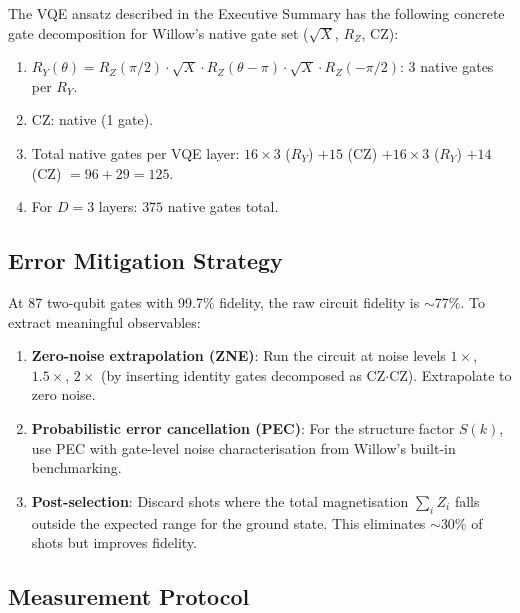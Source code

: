 \documentclass[11pt]{article}
\theoremstyle{definition}
\theoremstyle{remark}
\begin{document}
The VQE ansatz described in the Executive Summary has the following
concrete gate decomposition for Willow's native gate set
($\sqrt{X}$, $R_Z$, CZ):

\begin{enumerate}
\item $R_Y(\theta) = R_Z(\pi/2) \cdot \sqrt{X} \cdot R_Z(\theta - \pi)
  \cdot \sqrt{X} \cdot R_Z(-\pi/2)$: 3 native gates per $R_Y$.
\item CZ: native (1 gate).
\item Total native gates per VQE layer: $16 \times 3$ ($R_Y$)
  $+ 15$ (CZ) $+ 16 \times 3$ ($R_Y$) $+ 14$ (CZ) $= 96 + 29 = 125$.
\item For $D = 3$ layers: $375$ native gates total.
\end{enumerate}

\subsection{Error Mitigation Strategy}

At 87 two-qubit gates with 99.7\% fidelity, the raw circuit fidelity
is $\sim$77\%. To extract meaningful observables:

\begin{enumerate}[nosep]
\item \textbf{Zero-noise extrapolation (ZNE)}: Run the circuit at
  noise levels $1\times$, $1.5\times$, $2\times$ (by inserting identity
  gates decomposed as CZ$\cdot$CZ). Extrapolate to zero noise.
\item \textbf{Probabilistic error cancellation (PEC)}: For the
  structure factor $S(k)$, use PEC with gate-level noise characterisation
  from Willow's built-in benchmarking.
\item \textbf{Post-selection}: Discard shots where the total magnetisation
  $\sum_i Z_i$ falls outside the expected range for the ground state.
  This eliminates $\sim$30\% of shots but improves fidelity.
\end{enumerate}

\subsection{Measurement Protocol}
\end{document}
